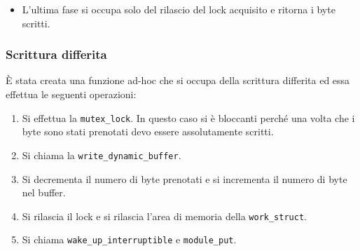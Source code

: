 \documentclass[oneside]{article}
\begin{document}
\begin{itemize}
\begin{itemize}
\begin{enumerate}
\item Viene incrementato il numero di byte nel buffer e viene invocata la \texttt{wake\_up\_interruptible}.
\end{enumerate}
\item Nel caso di \texttt{LOW PRIORITY}:
\begin{enumerate}
\item Si chiama la \texttt{try\_module\_get}.
\item Si collega solamente\footnote{Questo è un punto in favore in termini di performance perché all'interno della sezione critica si ha bisogno solamente di collegare il contenuto da scrivere alla struttura del deferred work.} il contenuto da scrivere al deferred work.
\item Si chiama \texttt{\_\_INIT\_WORK}.
\item Si incrementano i byte prenotati.
\item Si accoda il lavoro nella workqueue.
\end{enumerate}
\end{itemize}
\item L'ultima fase si occupa solo del rilascio del lock acquisito e ritorna i byte scritti.
\end{itemize}

\subsubsection{Scrittura differita}
È stata creata una funzione ad-hoc che si occupa della scrittura differita ed essa effettua le seguenti operazioni:
\begin{enumerate}
\item Si effettua la \texttt{mutex\_lock}. In questo caso si è bloccanti perché una volta che i byte sono stati prenotati devo essere assolutamente scritti.
\item Si chiama la \texttt{write\_dynamic\_buffer}.
\item Si decrementa il numero di byte prenotati e si incrementa il numero di byte nel buffer.
\item Si rilascia il lock e si rilascia l'area di memoria della \texttt{work\_struct}.
\item Si chiama \texttt{wake\_up\_interruptible} e \texttt{module\_put}.
\end{enumerate}
\end{document}
